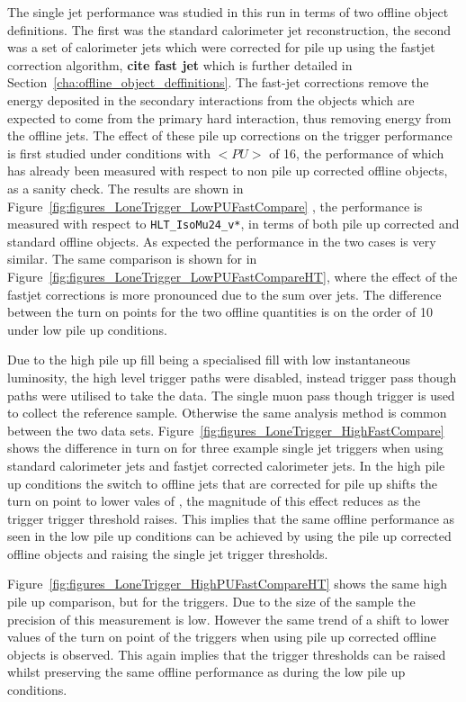 The \Lone single jet performance was studied in this run in terms of two offline object definitions. The first was the standard \AK calorimeter jet reconstruction, the second was a set of \AK calorimeter jets which were corrected for pile up using the fastjet correction algorithm, \textbf{cite fast jet} which is further detailed in Section~\ref{cha:offline_object_deffinitions}.
The fast-jet corrections remove the energy deposited in the secondary interactions from the objects which are expected to come from the primary hard interaction, thus removing energy from the offline jets.
The effect of these pile up corrections on the \Lone trigger performance is first studied under conditions with $<PU>$ of 16, the performance of which has already been measured with respect to non pile up corrected offline objects, as a sanity check. The results are shown in Figure~\ref{fig:figures_LoneTrigger_LowPUFastCompare} , the performance is measured with respect to \verb|HLT_IsoMu24_v*|, in terms of both pile up corrected and standard offline objects. As expected the performance in the two cases is very similar. The same comparison is shown for \HT in Figure~\ref{fig:figures_LoneTrigger_LowPUFastCompareHT}, where the effect of the fastjet corrections is more pronounced due to the sum over jets.
The difference between the turn on points for the two offline quantities is on the order of 10 \GeV under low pile up conditions.

Due to the high pile up fill being a specialised fill with low instantaneous luminosity, the high level trigger paths were disabled, instead \Lone trigger pass though paths were utilised to take the data. The \Lone single muon pass though trigger is used to collect the reference sample. Otherwise the same analysis method is common between the two data sets.
Figure~\ref{fig:figures_LoneTrigger_HighFastCompare} shows the difference in turn on for three example \Lone single jet triggers when using standard calorimeter jets and fastjet corrected calorimeter jets.
In the high pile up conditions the switch to offline jets that are corrected for pile up shifts the turn on point to lower vales of \ET, the magnitude of this effect reduces as the \Lone trigger trigger threshold raises. This implies that the same offline performance as seen in the low pile up conditions can be achieved by using the pile up corrected offline objects and raising the \Lone single jet trigger thresholds.

Figure~\ref{fig:figures_LoneTrigger_HighPUFastCompareHT} shows the same high pile up comparison, but for the \Lone \HT triggers. Due to the size of the sample the precision of this measurement is low. However the same trend of a shift to lower \HT values of the turn on point of the \Lone triggers when using pile up corrected offline objects is observed. This again implies that the \Lone \HT trigger thresholds can be raised whilst preserving the same offline performance as during the low pile up conditions.

